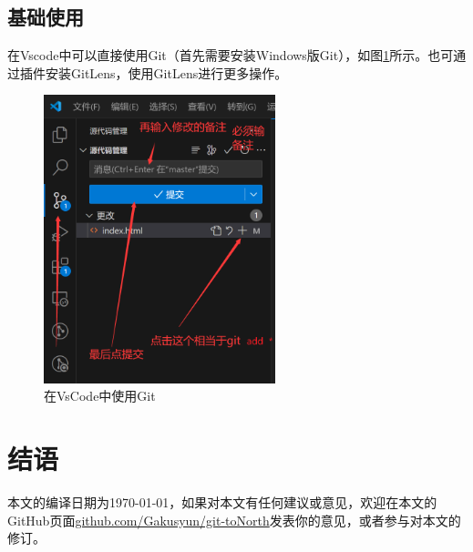 \documentclass[UTF8]{ctexart}
\begin{document}
\subsection{基础使用}
在Vscode中可以直接使用Git（首先需要安装Windows版Git），如图\ref{git-in-vscode}所示。也可通过插件安装GitLens，使用GitLens进行更多操作。
\begin{figure}[h]
    \centering
    \includegraphics[width=0.6\textwidth]{./img/git-in-vscode}
    \caption{在VsCode中使用Git}
    \label{git-in-vscode}
\end{figure}
\section{结语}
本文的编译日期为\today，如果对本文有任何建议或意见，欢迎在本文的GitHub页面\href{http://github.com/Gakusyun/git-toNorth}{github.com/Gakusyun/git-toNorth}发表你的意见，或者参与对本文的修订。
\end{document}
